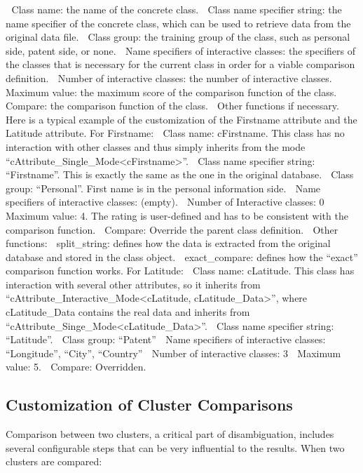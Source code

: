 \documentclass{article}
\begin{document}
 Class name: the name of the concrete class.
 Class name specifier string: the name specifier of the concrete class, which can be used to
retrieve data from the original data file.
 Class group: the training group of the class, such as personal side, patent side, or none.
 Name specifiers of interactive classes: the specifiers of the classes that is necessary for the
current class in order for a viable comparison definition.
 Number of interactive classes: the number of interactive classes.
 Maximum value: the maximum score of the comparison function of the class.
 Compare: the comparison function of the class.
 Other functions if necessary.
Here is a typical example of the customization of the Firstname attribute and the Latitude attribute.
For Firstname:
 Class name: cFirstname. This class has no interaction with other classes and thus simply
inherits from the mode “cAttribute\_Single\_Mode<cFirstname>”.
 Class name specifier string: “Firstname”. This is exactly the same as the one in the original
database.
 Class group: “Personal”. First name is in the personal information side.
 Name specifiers of interactive classes: {} (empty).
 Number of Interactive classes: 0
 Maximum value: 4. The rating is user-defined and has to be consistent with the comparison
function.
 Compare: Override the parent class definition.
 Other functions:
 split\_string: defines how the data is extracted from the original database and stored in the
class object.
 exact\_compare: defines how the “exact” comparison function works.
For Latitude:
 Class name: cLatitude. This class has interaction with several other attributes, so it inherits
from “cAttribute\_Interactive\_Mode<cLatitude, cLatitude\_Data>”, where cLatitude\_Data
contains the real data and inherits from “cAttribute\_Singe\_Mode<cLatitude\_Data>”.
 Class name specifier string: “Latitude”.
 Class group: “Patent”
 Name specifiers of interactive classes: {“Longitude”, “City”, “Country”}
 Number of interactive classes: 3
 Maximum value: 5.
 Compare: Overridden.

\subsection{Customization of Cluster Comparisons}

Comparison between two clusters, a critical part of 
disambiguation, includes several configurable
steps that can be very influential to the results.
When two clusters are compared:
\end{document}
